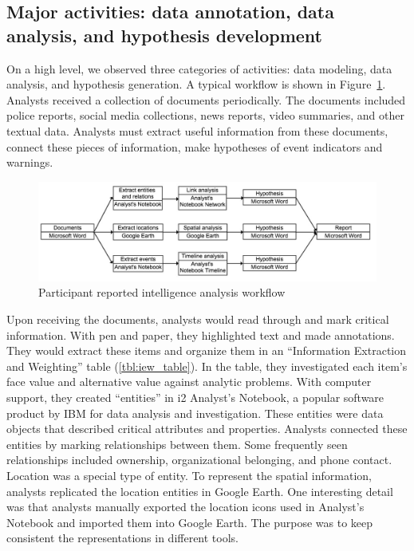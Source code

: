 \subsection{Major activities: data annotation, data analysis, and hypothesis development}

On a high level, we observed three categories of activities: data modeling, data analysis, and hypothesis generation. A typical workflow is shown in Figure~\ref{fig:workflow}. Analysts received a collection of documents periodically. The documents included police reports, social media collections, news reports, video summaries, and other textual data. Analysts must extract useful information from these documents, connect these pieces of information, make hypotheses of event indicators and warnings. 

\begin{figure}
	\centering
	\includegraphics[width=\columnwidth]{./03-System/img/workflow2.jpg}
	\caption{Participant reported intelligence analysis workflow\label{fig:workflow}}
\end{figure}

Upon receiving the documents, analysts would read through and mark critical information. With pen and paper, they highlighted text and made annotations. They would extract these items and organize them in an ``Information Extraction and Weighting'' table (\ref{tbl:iew_table}). In the table, they investigated each item's face value and alternative value against analytic problems. With computer support, they created ``entities'' in i2 Analyst's Notebook, a popular software product by IBM for data analysis and investigation. These entities were data objects that described critical attributes and properties. Analysts connected these entities by marking relationships between them. Some frequently seen relationships included ownership, organizational belonging, and phone contact. Location was a special type of entity. To represent the spatial information, analysts replicated the location entities in Google Earth. One interesting detail was that analysts manually exported the location icons used in Analyst's Notebook and imported them into Google Earth. The purpose was to keep consistent the representations in different tools. 


